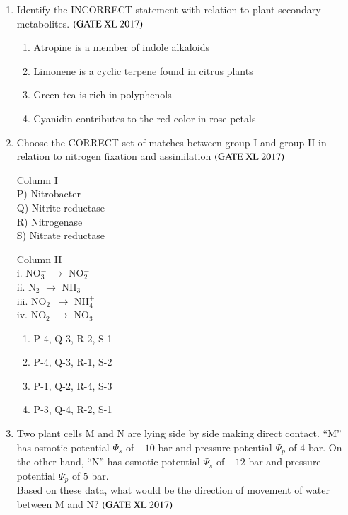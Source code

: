 \documentclass[journal]{IEEEtran}
\begin{document}
\begin{enumerate}
\item Identify the INCORRECT statement with relation to plant secondary metabolites. \hfill $\left(\text{GATE XL 2017}\right)$
\begin{enumerate}
    \item Atropine is a member of indole alkaloids
    \item Limonene is a cyclic terpene found in citrus plants
    \item Green tea is rich in polyphenols
    \item Cyanidin contributes to the red color in rose petals
\end{enumerate}

\item Choose the CORRECT set of matches between group I and group II in relation to nitrogen fixation and assimilation \hfill $\left(\text{GATE XL 2017}\right)$

\begin{multicols}{2}
\noindent Column I  \\
P) Nitrobacter \\
Q) Nitrite reductase \\
R) Nitrogenase \\
S) Nitrate reductase 

\columnbreak

\noindent Column II \\ 
i. NO$_3^-$ $\to$ NO$_2^-$ \\
ii. N$_2$ $\to$ NH$_3$ \\
iii. NO$_2^-$ $\to$ NH$_4^+$ \\
iv. NO$_2^-$ $\to$ NO$_3^-$
\end{multicols}

\begin{enumerate}
    \item P-4, Q-3, R-2, S-1
    \item P-4, Q-3, R-1, S-2
    \item P-1, Q-2, R-4, S-3
    \item P-3, Q-4, R-2, S-1
\end{enumerate}

\item Two plant cells M and N are lying side by side making direct contact. ``M'' has osmotic potential $\Psi_s$ of $-10$ bar and pressure potential $\Psi_p$ of $4$ bar. On the other hand, ``N'' has osmotic potential $\Psi_s$ of $-12$ bar and pressure potential $\Psi_p$ of $5$ bar.\\
Based on these data, what would be the direction of movement of water between M and N? \hfill $\left(\text{GATE XL 2017}\right)$
\begin{enumerate}
\end{enumerate}


\end{enumerate}
\end{document}
